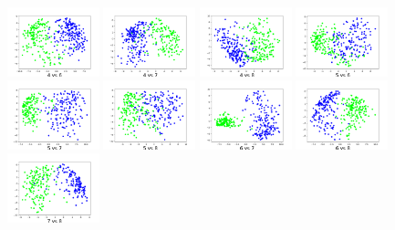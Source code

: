 \includegraphics[height=2cm]{./figs/4vs6.png}
\includegraphics[height=2cm]{./figs/4vs7.png}
\includegraphics[height=2cm]{./figs/4vs8.png}
\includegraphics[height=2cm]{./figs/5vs6.png}
\includegraphics[height=2cm]{./figs/5vs7.png}
\includegraphics[height=2cm]{./figs/5vs8.png}
\includegraphics[height=2cm]{./figs/6vs7.png}
\includegraphics[height=2cm]{./figs/6vs8.png}
\includegraphics[height=2cm]{./figs/7vs8.png}


